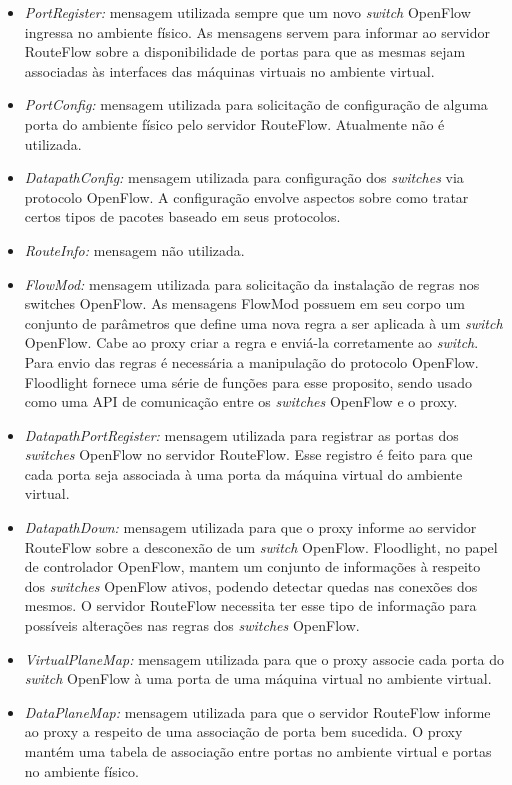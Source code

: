 \begin{itemize}
\item \textit{PortRegister:} mensagem utilizada sempre que um
novo \textit{switch} OpenFlow ingressa no ambiente físico. As mensagens 
servem para informar ao servidor RouteFlow sobre a disponibilidade
de portas para que as mesmas sejam associadas às interfaces
das máquinas virtuais no ambiente virtual.
\item \textit{PortConfig:} mensagem utilizada para solicitação de 
configuração de alguma porta do ambiente físico pelo servidor
RouteFlow. Atualmente não é utilizada.
\item \textit{DatapathConfig:} mensagem utilizada para
configuração dos \textit{switches} via protocolo OpenFlow. A 
configuração envolve aspectos sobre como tratar certos tipos
de pacotes baseado em seus protocolos.
\item \textit{RouteInfo:} mensagem não utilizada.
\item \textit{FlowMod:} mensagem utilizada para 
solicitação da instalação de regras nos switches 
OpenFlow. As mensagens FlowMod possuem em seu 
corpo um conjunto de parâmetros que define uma nova regra 
a ser aplicada à um \textit{switch} OpenFlow. Cabe ao proxy 
criar a regra e enviá-la corretamente ao \textit{switch}. 
Para envio das regras é necessária a manipulação do 
protocolo OpenFlow. Floodlight fornece uma série de 
funções para esse proposito, sendo usado como uma 
API de comunicação entre os \textit{switches} OpenFlow e o 
proxy.
\item \textit{DatapathPortRegister:} mensagem utilizada 
para registrar as portas dos \textit{switches} OpenFlow 
no servidor RouteFlow. Esse registro é feito para que cada 
porta seja associada à uma porta da máquina 
virtual do ambiente virtual.
\item \textit{DatapathDown:} mensagem utilizada para que 
o proxy informe ao servidor RouteFlow sobre a 
desconexão de um \textit{switch} OpenFlow. Floodlight, no papel 
de controlador OpenFlow, mantem um conjunto de 
informações à respeito dos \textit{switches} OpenFlow ativos, 
podendo detectar quedas nas conexões dos mesmos. O 
servidor RouteFlow necessita ter esse tipo de informação para 
possíveis alterações nas regras dos 
\textit{switches} OpenFlow.
\item \textit{VirtualPlaneMap:} mensagem utilizada para que 
o proxy associe cada porta do \textit{switch} 
OpenFlow à uma porta de uma máquina virtual no ambiente 
virtual.
\item \textit{DataPlaneMap:} mensagem utilizada para que o 
servidor RouteFlow informe ao proxy a 
respeito de uma associação de porta bem sucedida. O proxy 
mantém uma tabela de associação entre portas 
no ambiente virtual e portas no ambiente físico.
\end{itemize}

